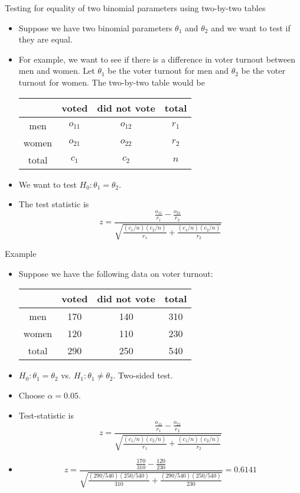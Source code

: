 \documentclass[10pt, handout, xcolor=table]{beamer}
\newcommand*\themecol{\usebeamercolor[fg]{structure}}
\begin{document}
\begin{frame}{Testing for equality of two binomial parameters using two-by-two tables}
\begin{itemize}\itemsep2ex
\item Suppose we have two binomial parameters $\theta_1$ and $\theta_2$ and we want to test if they are equal.
\item For example, we want to see if there is a difference in voter turnout between men and women. Let $\theta_1$ be the voter turnout for men and $\theta_2$ be the voter turnout for women. The two-by-two table would be
\medskip
{\footnotesize
\begin{table}[]
\begin{tabular}{|c|cc|c|}
\hline
      & voted & did not vote & total \\ \hline
men   & $o_{11}$ & $o_{12}$        & $r_1$  \\ 
women & $o_{21}$ & $o_{22}$        & $r_2$  \\ \hline
total & $c_1$  & $c_2$         & $n$     \\ \hline
\end{tabular}
\end{table}
}
\item We want to test $H_0: \theta_1 = \theta_2$.
\item The test statistic is
{\themecol
\[
z = \frac{\frac{o_{11}}{r_1}-\frac{o_{21}}{r_2}}{\sqrt{\frac{(c_1/n)(c_2/n)}{r_1}+\frac{(c_1/n)(c_2/n)}{r_2}}}
\]
}
\end{itemize}
\end{frame}

\begin{frame}{Example}
\begin{itemize}
\setlength{\itemsep}{8pt}
\item Suppose we have the following data on voter turnout:
\medskip
{\footnotesize
\begin{table}[]
\begin{tabular}{|c|cc|c|}
\hline
      & voted & did not vote & total \\ \hline
men   & 170 & 140       & 310  \\ 
women & 120 & 110        & 230  \\ \hline
total & 290  & 250        & 540     \\ \hline
\end{tabular}
\end{table}
}
\item<1->[Step 1] $H_0: \theta_1 = \theta_2$ vs. $H_1: \theta_1 \neq \theta_2$. Two-sided test. 
\item<2->[Step 2] Choose $\alpha = 0.05$. 
\item<3->[Step 3] Test-statistic is 
{\small
\[
z = \frac{\frac{o_{11}}{r_1}-\frac{o_{21}}{r_2}}{\sqrt{\frac{(c_1/n)(c_2/n)}{r_1}+\frac{(c_1/n)(c_2/n)}{r_2}}}
\]
}
\item<4->[]
{\small
\[
z = \frac{\frac{170}{310}-\frac{120}{230}}{\sqrt{\frac{(290/540)(250/540)}{310}+\frac{(290/540)(250/540)}{230}}} = 0.6141
\]
}
\end{itemize}
\end{frame}
\end{document}
